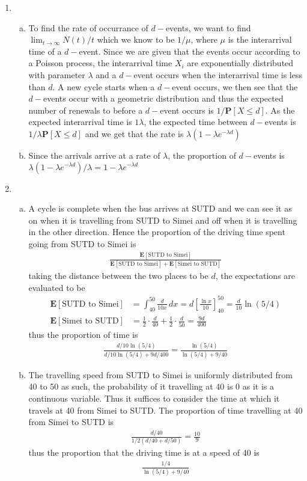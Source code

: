 \documentclass[a4paper,10pt]{article}
\theoremstyle{definition}
\begin{document}
\begin{enumerate}
\item
\begin{enumerate}[(a)]
\item To find the rate of occurrance of $d-$events, we want to find $\lim_{t\to\infty}N(t)/t$ which we know to be $1/\mu$, where $\mu$ is the interarrival time of a $d-$event. Since we are given that the events occur according to a Poisson process, the interarrival time $X_i$ are exponentially distributed with parameter $\lambda$ and a $d-$event occurs when the interarrival time is less than $d$. A new cycle starts when a $d-$event occurs, we then see that the $d-$events occur with a geometric distribution and thus the expected number of renewals to before a $d-$event occurs is $1/\mathbf{P}[X\leq d]$. As the expected interarrival time is $1\lambda$, the expected time between $d-$events is $1/\lambda \mathbf{P}[X\leq d]$ and we get that the rate is $\lambda(1-\lambda e^{-\lambda d})$
\item Since the arrivals arrive at a rate of $\lambda$, the proportion of $d-$events is $\lambda(1-\lambda e^{-\lambda d})/\lambda=1-\lambda e^{-\lambda d}$
\end{enumerate}


\item 
\begin{enumerate}[(a)]
\item A cycle is complete when the bus arrives at SUTD and we can see it as on when it is travelling from SUTD to Simei and off when it is travelling in the other direction. Hence the proportion of the driving time spent going from SUTD to Simei is 
\begin{align*}
\frac{\mathbf{E}[\text{SUTD to Simei}]}{\mathbf{E}[\text{SUTD to Simei}]+\mathbf{E}[\text{Simei to SUTD}]}
\end{align*}
taking the distance between the two places to be $d$, the expectations are evaluated to be
\begin{align*}
\mathbf{E}[\text{SUTD to Simei}]&=\int_{40}^{50}\frac{d}{10x}\,dx=d\left[\frac{\ln x}{10}\right]_{40}^{50}=\frac{d}{10}\ln(5/4)\\
\mathbf{E}[\text{Simei to SUTD}]&= \frac{1}{2}\cdot\frac{d}{40}+\frac{1}{2}\cdot\frac{d}{50}=\frac{9d}{400}
\end{align*}
thus the proportion of time is 
\begin{align*}
\frac{d/10\ln(5/4)}{d/10\ln(5/4)+9d/400}=\frac{\ln(5/4)}{\ln(5/4)+9/40}
\end{align*}
\item The travelling speed from SUTD to Simei is uniformly distributed from 40 to 50 as such, the probability of it travelling at 40 is 0 as it is a continuous variable. Thus it suffices to consider the time at which it travels at 40 from Simei to SUTD. The proportion of time travelling at 40 from Simei to SUTD is 
\begin{align*}
\frac{d/40}{1/2(d/40+d/50)}=\frac{10}{9}
\end{align*}
thus the proportion that the driving time is at a speed of 40 is 
\begin{align*}
\frac{1/4}{\ln(5/4)+9/40}
\end{align*}
\end{enumerate}

\end{enumerate}
\end{document}
